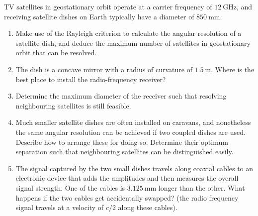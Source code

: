 \documentclass[english,a4paper,12pt]{report}
\begin{document}
{TV satellites in geostationary orbit operate at a carrier frequency of \(\SI{12}{\giga \hertz} \), and receiving satellite dishes on Earth typically have a diameter of \(\SI{850}{\mm} \).

\begin{enumerate}
    \item Make use of the Rayleigh criterion to calculate the angular resolution of a
satellite dish, and deduce the maximum number of satellites in geostationary orbit that
can be resolved.

    \item The dish is a concave mirror with a radius of curvature of \(\SI{1.5}{\m} \). Where is
the best place to install the radio-frequency receiver? 

    \item Determine the maximum diameter of the receiver such that resolving neighbouring satellites is still feasible.
    
    \item Much smaller satellite dishes are often installed on caravans, and nonetheless
the same angular resolution can be achieved if two coupled dishes are used. Describe
how to arrange these for doing so. Determine their optimum separation such that
neighbouring satellites can be distinguished easily. 

    \item The signal captured by the two small dishes travels along coaxial cables to an
electronic device that adds the amplitudes and then measures the overall signal strength.
One of the cables is \(\SI{3.125}{\mm} \) longer than the other. What happens if the two cables
get accidentally swapped? (the radio frequency signal travels at a velocity of \(c/2\) along
these cables).
\end{enumerate}
~
}
\end{document}
